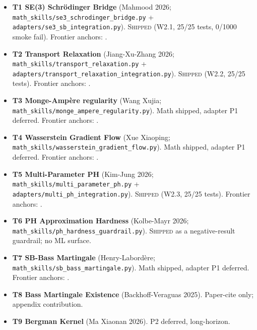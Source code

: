 \begin{itemize}
\item \textbf{T1 SE(3) Schrödinger Bridge} (Mahmood 2026;
  \texttt{math\_skills/se3\_schrodinger\_bridge.py} +
  \texttt{adapters/se3\_sb\_integration.py}).  \textsc{Shipped} (W2.1,
  25/25 tests, 0/1000 smoke fail).  Frontier anchors:
  \cite{lipman2023flowmatching,albergo2023stochasticinterpolants,
  guan2023targetdiff,han2024equiformerv2,holderrieth2024equivarianthpt}.
\item \textbf{T2 Transport Relaxation} (Jiang-Xu-Zhang 2026;
  \texttt{math\_skills/transport\_relaxation.py} +
  \texttt{adapters/transport\_relaxation\_integration.py}).
  \textsc{Shipped} (W2.2, 25/25 tests).  Frontier anchors:
  \cite{albergo2023stochasticinterpolants,koehler2024flowmatching,
  oko2023diffusionminimax,dou2024howfm}.
\item \textbf{T3 Monge-Amp\`ere regularity} (Wang Xujia;
  \texttt{math\_skills/monge\_ampere\_regularity.py}).  Math shipped,
  adapter P1 deferred.  Frontier anchors:
  \cite{holderrieth2024equivarianthpt,han2024equiformerv2,
  satorras2021egnn}.
\item \textbf{T4 Wasserstein Gradient Flow} (Xue Xiaoping;
  \texttt{math\_skills/wasserstein\_gradient\_flow.py}).  Math
  shipped, adapter P1 deferred.  Frontier anchors:
  \cite{albergo2023stochasticinterpolants,dou2024howfm,you2018gcn}.
\item \textbf{T5 Multi-Parameter PH} (Kim-Jung 2026;
  \texttt{math\_skills/multi\_parameter\_ph.py} +
  \texttt{adapters/multi\_ph\_integration.py}).  \textsc{Shipped}
  (W2.3, 25/25 tests).  Frontier anchors:
  \cite{karczewski2024egnngen,satorras2021egnn,neyshabur2017spectralnorm}.
\item \textbf{T6 PH Approximation Hardness} (Kolbe-Mayr 2026;
  \texttt{math\_skills/ph\_hardness\_guardrail.py}).  \textsc{Shipped}
  as a negative-result guardrail; no ML surface.
\item \textbf{T7 SB-Bass Martingale} (Henry-Labord\`ere;
  \texttt{math\_skills/sb\_bass\_martingale.py}).  Math shipped,
  adapter P1 deferred.  Frontier anchors:
  \cite{lipman2023flowmatching,albergo2023stochasticinterpolants,
  dou2024howfm}.
\item \textbf{T8 Bass Martingale Existence} (Backhoff-Veraguas 2025).
  Paper-cite only; appendix contribution.
\item \textbf{T9 Bergman Kernel} (Ma Xiaonan 2026).  P2 deferred,
  long-horizon.
\end{itemize}

